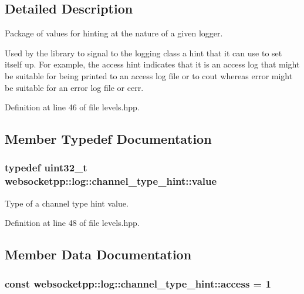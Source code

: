 \subsection{Detailed Description}
Package of values for hinting at the nature of a given logger. 

Used by the library to signal to the logging class a hint that it can use to set itself up. For example, the {\ttfamily access} hint indicates that it is an access log that might be suitable for being printed to an access log file or to cout whereas {\ttfamily error} might be suitable for an error log file or cerr. 

Definition at line 46 of file levels.\+hpp.



\subsection{Member Typedef Documentation}
\hypertarget{structwebsocketpp_1_1log_1_1channel__type__hint_ad12a7f6555b71aabdc4cbec604dc89dd}{}
\subsubsection[{value}]{\setlength{\rightskip}{0pt plus 5cm}typedef uint32\+\_\+t {\bf websocketpp\+::log\+::channel\+\_\+type\+\_\+hint\+::value}}\label{structwebsocketpp_1_1log_1_1channel__type__hint_ad12a7f6555b71aabdc4cbec604dc89dd}


Type of a channel type hint value. 



Definition at line 48 of file levels.\+hpp.



\subsection{Member Data Documentation}
\hypertarget{structwebsocketpp_1_1log_1_1channel__type__hint_a8c38587fffbffbfcfc35577734b0d653}{}
\subsubsection[{access}]{ const websocketpp\+::log\+::channel\+\_\+type\+\_\+hint\+::access = 1\hspace{0.3cm}{\ttfamily [static]}}\label{structwebsocketpp_1_1log_1_1channel__type__hint_a8c38587fffbffbfcfc35577734b0d653}


